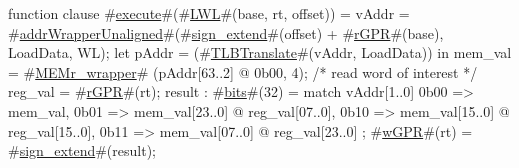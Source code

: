 function clause #\hyperref[zexecute]{execute}#(#\hyperref[zLWL]{LWL}#(base, rt, offset)) =
      {
        vAddr = #\hyperref[zaddrWrapperUnaligned]{addrWrapperUnaligned}#(#\hyperref[zsignzyextend]{sign\_extend}#(offset) + #\hyperref[zrGPR]{rGPR}#(base), LoadData, WL);
        let pAddr = (#\hyperref[zTLBTranslate]{TLBTranslate}#(vAddr, LoadData)) in
          {
            mem_val = #\hyperref[zMEMrzywrapper]{MEMr\_wrapper}# (pAddr[63..2] @ 0b00, 4); /* read word of interest */
            reg_val = #\hyperref[zrGPR]{rGPR}#(rt);
            result : #\hyperref[zbits]{bits}#(32) = match vAddr[1..0]
              {
                0b00  => mem_val,
                0b01  => mem_val[23..0] @ reg_val[07..0],
                0b10  => mem_val[15..0] @ reg_val[15..0],
                0b11  => mem_val[07..0] @ reg_val[23..0]
	      };
	    #\hyperref[zwGPR]{wGPR}#(rt) = #\hyperref[zsignzyextend]{sign\_extend}#(result);
          }
      }
